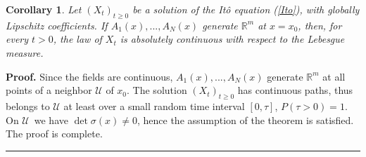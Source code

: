\documentclass[11pt,a4paper]{article}%
\newtheorem{corollary}[theorem]{Corollary}
\newenvironment{proof}[1][Proof]{\textbf{#1.} }{\ \rule{0.5em}{0.5em}}
\begin{document}
\begin{corollary}
\label{Corollary 2 Appendix}Let $(X_{t})_{t\geq0}$ be a solution of the
It\^{o} equation (\ref{Ito}), with globally Lipschitz coefficients. If
$A_{1}(x),...,A_{N}(x)$ generate $\mathbb{R}^{m}$ at $x=x_{0}$, then, for
every $t>0$, the law of $X_{t}$ is absolutely continuous with respect to the
Lebesgue measure.
\end{corollary}

\begin{proof}
Since the fields are continuous, $A_{1}( x) ,...,A_{N}( x) $ generate
$\mathbb{R}^{m}$ at all points of a neighbor $\mathcal{U}$ of $x_{0}$. The
solution $( X_{t}) _{t\geq0}$ has continuous paths, thus belongs to
$\mathcal{U}$ at least over a small random time interval $[ 0,\tau] $, $P(
\tau>0) =1$. On $\mathcal{U}$\ we have $\det\sigma( x) \neq0$, hence the
assumption of the theorem is satisfied. The proof is complete.
\end{proof}
\end{document}
